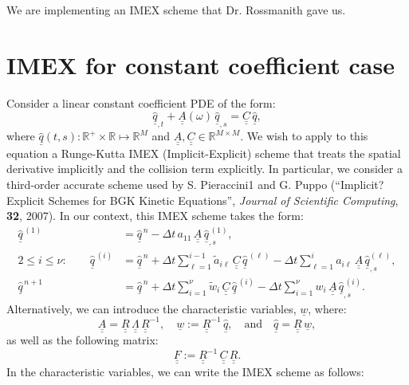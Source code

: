 \documentclass[12pt]{article}
\newcommand{\reals}{\mathbb R}
\newcommand{\bunderline}[1]{\underline{#1}}
\renewcommand{\vec}[1]{{\bunderline{#1}}}
\newcommand{\mat}[1]{{\bunderline{\bunderline{#1}}}}
\begin{document}
We are implementing an IMEX scheme that Dr. Rossmanith gave us.

\def\qr{\hat{q}}

\section{IMEX for constant coefficient case}
Consider a linear constant coefficient PDE of the form:
\begin{equation}
\vec{\qr}_{,t} + \mat{A}\left(\omega \right) \, \vec{\qr}_{,s} = \mat{C} \, \vec{\qr},
\end{equation}
where $\vec{\qr}(t,s): \reals^+ \times \reals \mapsto \reals^M$ and
$\mat{A}, \mat{C} \in \reals^{M \times M}$. We wish to apply to this equation a
Runge-Kutta IMEX (Implicit-Explicit) scheme that treats the spatial derivative implicitly and the collision term explicitly. In particular, we consider a third-order accurate scheme used by S. Pieraccini1 and G. Puppo (``Implicit?Explicit Schemes for BGK Kinetic Equations'', {\it Journal of Scientific Computing}, {\bf 32}, 2007). 
In our context, this IMEX scheme takes the form:
\begin{align}
        \vec{\qr}^{ \, (1)} &= \vec{\qr}^{ \, n} - {\Delta t} \, a_{11} \, \mat{A} \, \vec{\qr}^{ \, (1)}_{,s}, \\
       2 \le i \le \nu: \qquad \vec{\qr}^{ \, (i)} &= \vec{\qr}^{ \, n} + \Delta t \sum_{\ell = 1}^{i-1} \tilde{a}_{i\ell} \, \mat{C} \, \vec{\qr}^{ \, (\ell)} - {\Delta t} \sum_{\ell=1}^{i} a_{i\ell} \, \mat{A} \, \vec{\qr}^{(\ell)}_{,s}, \\
        \vec{\qr}^{ \, n+1} &= \vec{\qr}^{ \, n} + \Delta t \sum_{i=1}^{\nu} \tilde{w}_i \, \mat{C} \, \vec{\qr}^{ \, (i)} - {\Delta t} \sum_{i = 1}^{\nu} w_i \, \mat{A} \, \vec{\qr}^{ \, (i)}_{,s}.
\end{align}
Alternatively, we can introduce the characteristic variables, $\vec{w}$, where:
\begin{equation}
\mat{A} = \mat{R} \, \mat{\Lambda} \, \mat{R}^{-1}, \quad \vec{w} := \mat{R}^{-1} \, \vec{\qr},
\quad \text{and} \quad \vec{\qr} = \mat{R} \, \vec{w},
\end{equation}
as well as the following matrix:
\begin{equation}
 \mat{F} := \mat{R}^{-1} \, \mat{C} \, \mat{R}.
\end{equation}
In the characteristic variables, we can write the IMEX scheme as follows:
\end{document}
